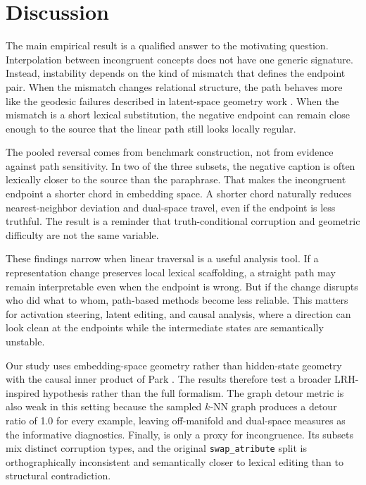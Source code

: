 \section{Discussion}
\label{sec:discussion}

 The main empirical result is a qualified answer to the motivating question. Interpolation between incongruent concepts does not have one generic signature. Instead, instability depends on the kind of mismatch that defines the endpoint pair. When the mismatch changes relational structure, the path behaves more like the geodesic failures described in latent-space geometry work \cite{shao2017riemannian,michelis2021linear}. When the mismatch is a short lexical substitution, the negative endpoint can remain close enough to the source that the linear path still looks locally regular.

 The pooled reversal comes from benchmark construction, not from evidence against path sensitivity. In two of the three subsets, the negative caption is often lexically closer to the source than the paraphrase. That makes the incongruent endpoint a shorter chord in embedding space. A shorter chord naturally reduces nearest-neighbor deviation and dual-space travel, even if the endpoint is less truthful. The result is a reminder that truth-conditional corruption and geometric difficulty are not the same variable.

 These findings narrow when linear traversal is a useful analysis tool. If a representation change preserves local lexical scaffolding, a straight path may remain interpretable even when the endpoint is wrong. But if the change disrupts who did what to whom, path-based methods become less reliable. This matters for activation steering, latent editing, and causal analysis, where a direction can look clean at the endpoints while the intermediate states are semantically unstable.

 Our study uses embedding-space geometry rather than hidden-state geometry with the causal inner product of Park \etal \cite{park2024lrh}. The results therefore test a broader LRH-inspired hypothesis rather than the full formalism. The graph detour metric is also weak in this setting because the sampled $k$-NN graph produces a detour ratio of 1.0 for every example, leaving off-manifold and dual-space measures as the informative diagnostics. Finally, \sugarcrepe is only a proxy for incongruence. Its subsets mix distinct corruption types, and the original \texttt{swap\_atribute} split is orthographically inconsistent and semantically closer to lexical editing than to structural contradiction.
